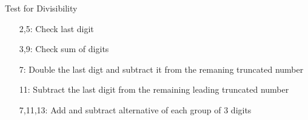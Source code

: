 
\begin{mysubsection}{Test for Divisibility}
    \begin{itemize}
        \item [2,5:] Check last digit
        \item [3,9:] Check sum of digits
        \item [7:] Double the last digt and subtract it from the remaning truncated number
        \item [11:] Subtract the last digit from the remaining leading truncated number
        \item [7,11,13:]
            Add and subtract alternative of each group of 3 digits
    \end{itemize}
\end{mysubsection}

\begin{shortque}{}

\end{shortque}

